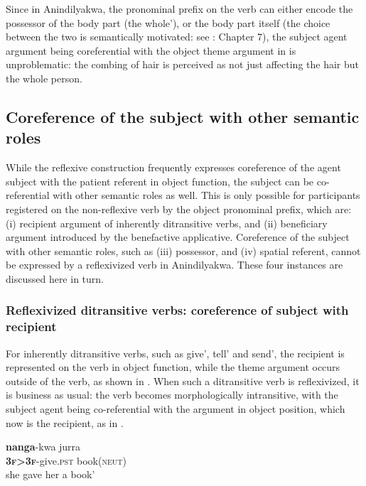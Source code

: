 \documentclass[output=paper]{langscibook}
\begin{document}
Since in Anindilyakwa, the pronominal prefix on the verb can either encode the possessor of the body part (the whole’), or the body part itself (the choice between the two is semantically motivated: see \citealt{VanEgmond2012}: Chapter 7), the subject agent argument being coreferential with the object theme argument in  is unproblematic: the combing of hair is perceived as not just affecting the hair but the whole person.



\subsection{Coreference of the subject with other semantic roles}\label{sec:vanegmond:3.2}



{While the reflexive construction frequently expresses coreference of the agent subject with the patient referent in object function, the subject can be co-referential with other semantic roles as well. This is only possible for participants registered on the non-reflexive verb by the object pronominal prefix, which are: (i) recipient argument of inherently ditransitive verbs, and (ii) beneficiary argument introduced by the benefactive applicative. Coreference of the subject with other semantic roles, such as (iii) possessor, and (iv) spatial referent, cannot be expressed by a reflexivized verb in Anindilyakwa. These four instances are discussed here in turn.}

\subsubsection{Reflexivized ditransitive verbs: coreference of subject with recipient} \label{sec:vanegmond:3.2.1}

For inherently ditransitive verbs, such as give’, tell’ and send’, the recipient is represented on the verb in object function, while the theme argument occurs outside of the verb, as shown in . When such a ditransitive verb is reflexivized, it is business as usual: the verb becomes morphologically intransitive, with the subject agent being co-referential with the argument in object position, which now is the recipient, as in .

\ea%
 \label{ex:vanegmond:23}

 \ea
 \label{ex:vanegmond:23a}
\gll \textbf{nanga}-kwa jurra\\
\textbf{\textsc{3f>3f}}-give.\textsc{pst} book(\textsc{neut})\\
\glt she gave her a book’
\end{document}
